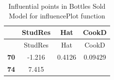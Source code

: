 \documentclass[]{elsarticle} %
\begin{document}
\begin{longtable}[]{@{}cccc@{}}
\caption{Influential points in Bottles Sold Model for influencePlot
function}\tabularnewline
\toprule
\begin{minipage}[b]{0.12\columnwidth}\centering\strut
~\strut
\end{minipage} & \begin{minipage}[b]{0.12\columnwidth}\centering\strut
StudRes\strut
\end{minipage} & \begin{minipage}[b]{0.10\columnwidth}\centering\strut
Hat\strut
\end{minipage} & \begin{minipage}[b]{0.10\columnwidth}\centering\strut
CookD\strut
\end{minipage}\tabularnewline
\midrule
\endfirsthead
\toprule
\begin{minipage}[b]{0.12\columnwidth}\centering\strut
~\strut
\end{minipage} & \begin{minipage}[b]{0.12\columnwidth}\centering\strut
StudRes\strut
\end{minipage} & \begin{minipage}[b]{0.10\columnwidth}\centering\strut
Hat\strut
\end{minipage} & \begin{minipage}[b]{0.10\columnwidth}\centering\strut
CookD\strut
\end{minipage}\tabularnewline
\midrule
\endhead
\begin{minipage}[t]{0.12\columnwidth}\centering\strut
\textbf{70}\strut
\end{minipage} & \begin{minipage}[t]{0.12\columnwidth}\centering\strut
-1.216\strut
\end{minipage} & \begin{minipage}[t]{0.10\columnwidth}\centering\strut
0.4126\strut
\end{minipage} & \begin{minipage}[t]{0.10\columnwidth}\centering\strut
0.09429\strut
\end{minipage}\tabularnewline
\begin{minipage}[t]{0.12\columnwidth}\centering\strut
\textbf{74}\strut
\end{minipage} & \begin{minipage}[t]{0.12\columnwidth}\centering\strut
7.415\strut
\end{minipage} & \begin{minipage}[t]{0.10\columnwidth}\centering\strut

\end{minipage}
\end{longtable}
\end{document}
